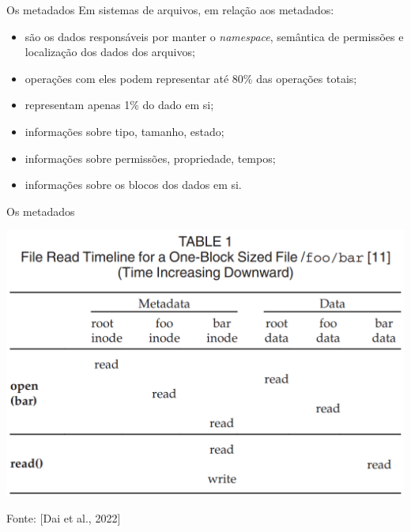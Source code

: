 \documentclass[xcolor=dvipsnames,table]{beamer}
\begin{document}
\begin{frame}{Os metadados}
	Em sistemas de arquivos, em relação aos metadados:
	\begin{itemize}
		\item são os dados responsáveis por manter o \textit{namespace}, semântica de permissões e localização dos dados dos arquivos;
		\item operações com eles podem representar até 80\% das operações totais;
		\item representam apenas 1\% do dado em si;
		\item informações sobre tipo, tamanho, estado;
		\item informações sobre permissões, propriedade, tempos;
		\item informações sobre os blocos dos dados em si.
	\end{itemize}
\end{frame}

\begin{frame}{Os metadados}
	\begin{center}
		\includegraphics[scale=0.25]{metadados1.png}
	\end{center}
	Fonte: [Dai et al., 2022]
\end{frame}
\end{document}
